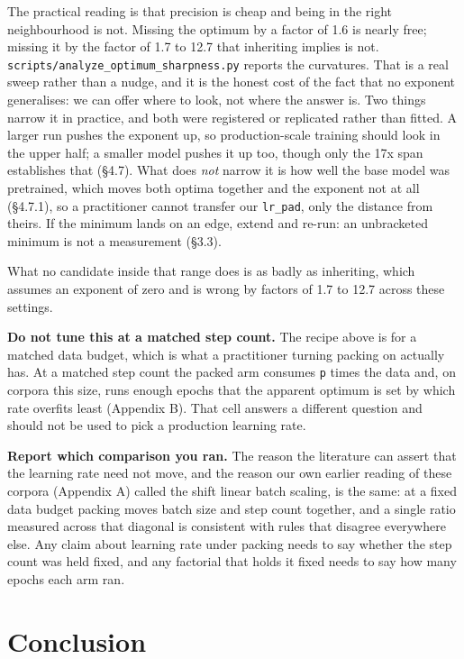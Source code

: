\documentclass[11pt]{article}
\begin{document}
The practical reading is that precision is cheap and being in the right neighbourhood is not. Missing the optimum by a factor of 1.6 is nearly free; missing it by the factor of 1.7 to 12.7 that inheriting implies is not. \texttt{scripts/\allowbreak{}analyze\_\allowbreak{}optimum\_\allowbreak{}sharpness.py} reports the curvatures. That is a real sweep rather than a nudge, and it is the honest cost of the fact that no exponent generalises: we can offer where to look, not where the answer is. Two things narrow it in practice, and both were registered or replicated rather than fitted. A larger run pushes the exponent up, so production-scale training should look in the upper half; a smaller model pushes it up too, though only the 17x span establishes that (\S{}4.7). What does \emph{not} narrow it is how well the base model was pretrained, which moves both optima together and the exponent not at all (\S{}4.7.1), so a practitioner cannot transfer our \texttt{lr\_\allowbreak{}pad}, only the distance from theirs. If the minimum lands on an edge, extend and re-run: an unbracketed minimum is not a measurement (\S{}3.3).

What no candidate inside that range does is as badly as inheriting, which assumes an exponent of zero and is wrong by factors of 1.7 to 12.7 across these settings.

\textbf{Do not tune this at a matched step count.} The recipe above is for a matched data budget, which is what a practitioner turning packing on actually has. At a matched step count the packed arm consumes \texttt{p} times the data and, on corpora this size, runs enough epochs that the apparent optimum is set by which rate overfits least (Appendix B). That cell answers a different question and should not be used to pick a production learning rate.

\textbf{Report which comparison you ran.} The reason the literature can assert that the learning rate need not move, and the reason our own earlier reading of these corpora (Appendix A) called the shift linear batch scaling, is the same: at a fixed data budget packing moves batch size and step count together, and a single ratio measured across that diagonal is consistent with rules that disagree everywhere else. Any claim about learning rate under packing needs to say whether the step count was held fixed, and any factorial that holds it fixed needs to say how many epochs each arm ran.

\section{Conclusion}
\end{document}
